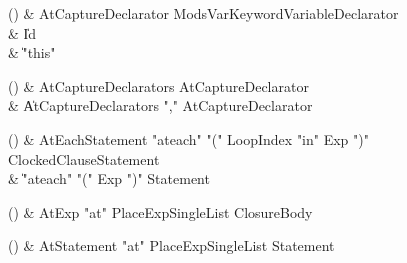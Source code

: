 \begin{bbgrammarappendix}

() & AtCaptureDeclarator \label{prod:AtCaptureDeclarator}  \: Mods\opt VarKeyword\opt VariableDeclarator  \\

 &    \| Id \\
 &    \| \xcd"this" \\

\end{bbgrammarappendix}

\begin{bbgrammarappendix}

() & AtCaptureDeclarators \label{prod:AtCaptureDeclarators}  \: AtCaptureDeclarator  \\

 &    \| AtCaptureDeclarators \xcd"," AtCaptureDeclarator \\

\end{bbgrammarappendix}

\begin{bbgrammarappendix}

() & AtEachStatement \label{prod:AtEachStatement}  \: \xcd"ateach" \xcd"(" LoopIndex \xcd"in" Exp \xcd")" ClockedClause\opt Statement  \\

 &    \| \xcd"ateach" \xcd"(" Exp \xcd")" Statement \\

\end{bbgrammarappendix}

\begin{bbgrammarappendix}

() & AtExp \label{prod:AtExp}  \: \xcd"at" PlaceExpSingleList ClosureBody  \\


\end{bbgrammarappendix}

\begin{bbgrammarappendix}

() & AtStatement \label{prod:AtStatement}  \: \xcd"at" PlaceExpSingleList Statement  \\


\end{bbgrammarappendix}

